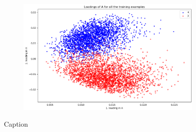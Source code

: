\begin{figure}
\begin{subfigure}{0.49\linewidth}
    \end{subfigure}
    \begin{subfigure}{\linewidth}
        \includegraphics[width=\linewidth]{Pics/05_methodology/LoadingsOfAScatterMNIST.png}
    \end{subfigure}
    \caption{Caption}
    \label{fig:my_label}
\end{figure}